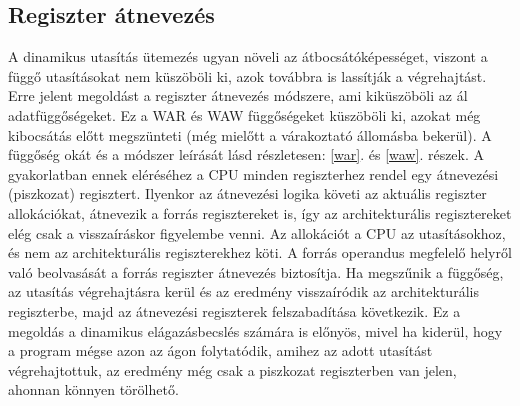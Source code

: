 \subsection{Regiszter átnevezés}
A dinamikus utasítás ütemezés ugyan növeli az átbocsátóképességet, viszont a függő utasításokat nem küszöböli ki, azok továbbra is lassítják a végrehajtást.
Erre jelent megoldást a regiszter átnevezés módszere, ami kiküszöböli az ál adatfüggőségeket.
Ez a WAR és WAW függőségeket küszöböli ki, azokat még kibocsátás előtt megszünteti (még mielőtt a várakoztató állomásba bekerül).
A függőség okát és a módszer leírását lásd részletesen: \ref{war}. és \ref{waw}. részek.
A gyakorlatban ennek eléréséhez a CPU minden regiszterhez rendel egy átnevezési (piszkozat) regisztert.
Ilyenkor az átnevezési logika követi az aktuális regiszter allokációkat, átnevezik a forrás regisztereket is, így az architekturális regisztereket elég csak a visszaíráskor figyelembe venni.
Az allokációt a CPU az utasításokhoz, és nem az architekturális regiszterekhez köti.
A forrás operandus megfelelő helyről való beolvasását a forrás regiszter átnevezés biztosítja.
Ha megszűnik a függőség, az utasítás végrehajtásra kerül és az eredmény visszaíródik az architekturális regiszterbe, majd az átnevezési regiszterek felszabadítása következik.
Ez a megoldás a dinamikus elágazásbecslés számára is előnyös, mivel ha kiderül, hogy a program mégse azon az ágon folytatódik, amihez az adott utasítást végrehajtottuk, az eredmény még csak a piszkozat regiszterben van jelen, ahonnan könnyen törölhető.

